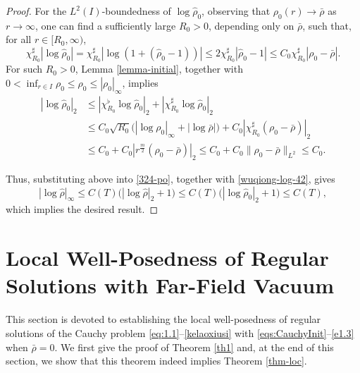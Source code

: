 \documentclass[11pt,reqno]{amsart}
\numberwithin{rk}{section}
\numberwithin{prop}{section}
\numberwithin{mydef}{section}
\numberwithin{lem}{section}
\numberwithin{equation}{section}
\numberwithin{thm}{section}
\begin{document}
\begin{proof}
For the $L^2(I)$-boundedness of $\log\hat\rho_0$, observing that $\rho_0(r)\to \bar\rho$ as $r\to \infty$, one can find a sufficiently large $R_0>0$, depending only on $\bar\rho$, such that, for all $r\in [R_0,\infty)$, 
\begin{equation*} 
\chi_{R_0}^\sharp|\log\hat\rho_0|
=\chi_{R_0}^\sharp|\log(1+(\hat\rho_0-1))|\leq 2\chi_{R_0}^\sharp|\hat\rho_0-1|
\leq C_0\chi_{R_0}^\sharp|\rho_0-\bar\rho|.
\end{equation*}
For such $R_0>0$, Lemma \ref{lemma-initial}, together with $0<\inf_{r\in I}\rho_0\leq \rho_0\leq |\rho_0|_\infty$, implies 
\begin{equation*} 
\begin{aligned}
|\log\hat\rho_0|_2&\leq |\chi_{R_0}^\flat\log\hat\rho_0|_2
+|\chi_{R_0}^\sharp\log\hat\rho_0|_2\\
&\leq C_0\sqrt{R_0}\big(|\log\rho_0|_\infty+|\log\bar\rho|\big)+C_0|\chi_{R_0}^\sharp (\rho_0-\bar\rho)|_2\\
&\leq C_0+C_0|r^\frac{m}{2} (\rho_0-\bar\rho)|_2\leq C_0+C_0\|\rho_0-\bar\rho\|_{L^2}\leq C_0.
\end{aligned}
\end{equation*}

Thus, substituting above into \eqref{324-po}, together with \eqref{wuqiong-log-42}, gives
\begin{equation*}
|\log\hat\rho|_\infty\leq C(T)\big(|\log\hat\rho|_2 +1\big)\leq C(T)\big(|\log\hat\rho_0|_2+1\big)\leq C(T),
\end{equation*}
which implies the desired result.
\end{proof} 



\section{Local Well-Posedness  of Regular Solutions with Far-Field Vacuum}
\label{section-local-regular}

This section is devoted to establishing the local well-posedness of regular solutions of the Cauchy problem \eqref{eq:1.1}--\eqref{kelaoxiusi} with \eqref{eqs:CauchyInit}--\eqref{e1.3}  when $\bar\rho=0$. We first give the proof of Theorem \ref{th1} and,  at the end of this section, we show that this theorem indeed implies Theorem \ref{thm-loc}.
\end{document}
